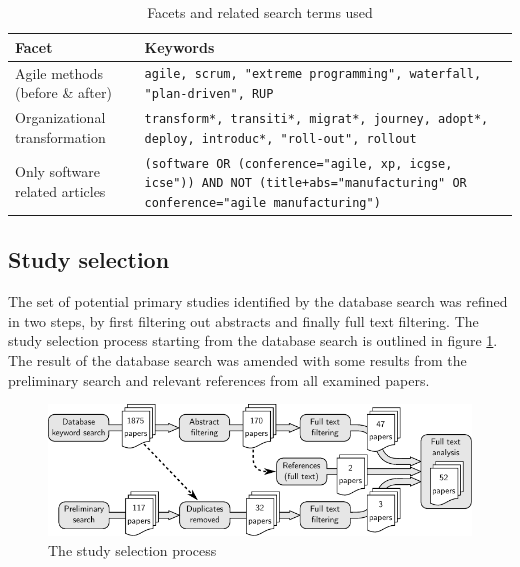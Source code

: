 \begin{table}
    \centering
    \begin{tabular}{ >{\raggedright\arraybackslash}p{}
                     >{\raggedright\arraybackslash}p{} }
        \toprule
        Facet                  & Keywords   \\
        \midrule
        Agile methods (before \& after) &
            \texttt{agile, scrum, "extreme programming",
            waterfall, "plan-driven", RUP}\\
        Organizational transformation &
            \texttt{transform*, transiti*, migrat*, journey, adopt*, deploy, introduc*,
            "roll-out", rollout}\\
        Only software related articles &
            \texttt{(software OR (conference="agile, xp, icgse, icse"))
            AND NOT (title+abs="manufacturing" OR conference="agile manufacturing")}
        \\
        \bottomrule
    \end{tabular}
    \caption{Facets and related search terms used}
    \label{table:searchterms}
\end{table}


\subsection{Study selection}

The set of potential primary studies identified by the database search was
refined in two steps, by first filtering out abstracts and finally full text
filtering. The study selection process starting from the database search is
outlined in figure \ref{fig:selectionprocess_full}. The result of the database
search was amended with some results from the preliminary search and relevant
references from all examined papers.

\begin{figure}[b]
  \begin{center}
    \includegraphics[width=1\textwidth]{graphics/research_process_full.pdf}
    \caption{The study selection process}
    \label{fig:selectionprocess_full}
  \end{center}
\end{figure}

